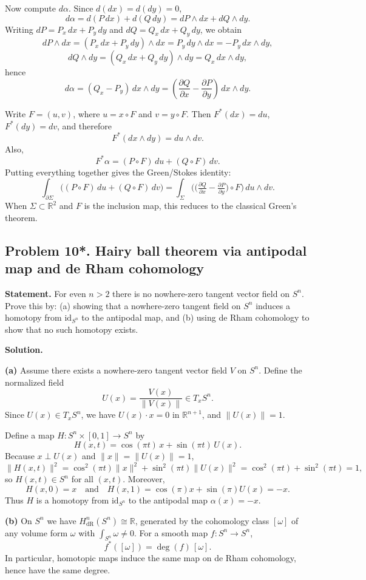 \documentclass[12pt,a4paper]{article}
\theoremstyle{plain}
\theoremstyle{definition}      %
\begin{document}
	Now compute $d\alpha$. Since $d(dx)=d(dy)=0$,
	\[
	d\alpha = d(P\,dx)+d(Q\,dy)= dP\wedge dx + dQ\wedge dy.
	\]
	Writing $dP=P_x\,dx+P_y\,dy$ and $dQ=Q_x\,dx+Q_y\,dy$, we obtain
	\[
	dP\wedge dx = (P_x\,dx+P_y\,dy)\wedge dx = P_y\,dy\wedge dx = -P_y\,dx\wedge dy,
	\]
	\[
	dQ\wedge dy = (Q_x\,dx+Q_y\,dy)\wedge dy = Q_x\,dx\wedge dy,
	\]
	hence
	\[
	d\alpha = (Q_x - P_y)\,dx\wedge dy
	=
	\left(\frac{\partial Q}{\partial x}-\frac{\partial P}{\partial y}\right)\,dx\wedge dy.
	\]
	
	Write $F=(u,v)$, where $u=x\circ F$ and $v=y\circ F$. Then $F^*(dx)=du$, $F^*(dy)=dv$, and therefore
	\[
	F^*(dx\wedge dy)=du\wedge dv.
	\]
	Also,
	\[
	F^*\alpha = (P\circ F)\,du + (Q\circ F)\,dv.
	\]
	Putting everything together gives the Green/Stokes identity:
	\[
	\int_{\partial\Sigma}\Big( (P\circ F)\,du + (Q\circ F)\,dv\Big)
	=
	\int_{\Sigma}
	\Big(\big(\tfrac{\partial Q}{\partial x}-\tfrac{\partial P}{\partial y}\big)\circ F\Big)\,du\wedge dv.
	\]
	When $\Sigma\subset\mathbb{R}^2$ and $F$ is the inclusion map, this reduces to the classical Green's theorem.
	
	
\subsection*{Problem 10*. Hairy ball theorem via antipodal map and de Rham cohomology}

\textbf{Statement.}
For even $n>2$ there is no nowhere-zero tangent vector field on $S^n$.
Prove this by:
(a) showing that a nowhere-zero tangent field on $S^n$ induces a homotopy from $\mathrm{id}_{S^n}$ to the antipodal map,
and (b) using de Rham cohomology to show that no such homotopy exists.

\textbf{Solution.}

\textbf{(a)} Assume there exists a nowhere-zero tangent vector field $V$ on $S^n$.
Define the normalized field
\[
U(x)=\frac{V(x)}{\|V(x)\|}\in T_xS^n.
\]
Since $U(x)\in T_xS^n$, we have $U(x)\cdot x=0$ in $\mathbb{R}^{n+1}$, and $\|U(x)\|=1$.

Define a map $H:S^n\times[0,1]\to S^n$ by
\[
H(x,t)=\cos(\pi t)\,x+\sin(\pi t)\,U(x).
\]
Because $x\perp U(x)$ and $\|x\|=\|U(x)\|=1$,
\[
\|H(x,t)\|^2=\cos^2(\pi t)\|x\|^2+\sin^2(\pi t)\|U(x)\|^2
=\cos^2(\pi t)+\sin^2(\pi t)=1,
\]
so $H(x,t)\in S^n$ for all $(x,t)$.
Moreover,
\[
H(x,0)=x \quad\text{and}\quad H(x,1)=\cos(\pi)x+\sin(\pi)U(x)=-x.
\]
Thus $H$ is a homotopy from $\mathrm{id}_{S^n}$ to the antipodal map $\alpha(x)=-x$.

\textbf{(b)} On $S^n$ we have $H^n_{\mathrm{dR}}(S^n)\cong \mathbb{R}$, generated by the cohomology class $[\omega]$
of any volume form $\omega$ with $\int_{S^n}\omega\neq 0$.
For a smooth map $f:S^n\to S^n$,
\[
f^*([\omega])=\deg(f)\,[\omega].
\]
In particular, homotopic maps induce the same map on de Rham cohomology, hence have the same degree.
\end{document}
